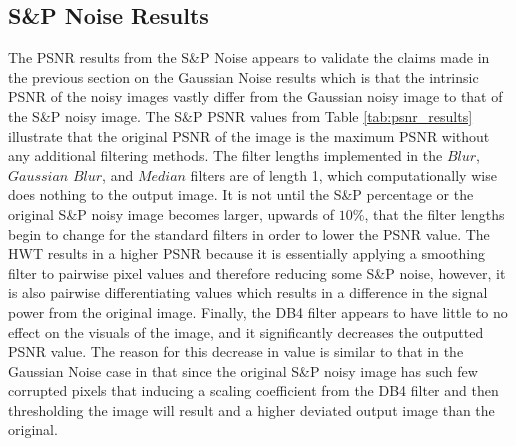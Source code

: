 \documentclass{article}\raggedbottom
\begin{document}
\subsection{S\&P Noise Results}
The PSNR results from the S\&P Noise appears to validate the claims made in the previous section on the Gaussian Noise results which is that the intrinsic PSNR of the noisy images vastly differ from the Gaussian noisy image to that of the S\&P noisy image. The S\&P PSNR values from Table \ref{tab:psnr_results} illustrate that the original PSNR of the image is the maximum PSNR without any additional filtering methods. The filter lengths implemented in the $Blur$, $Gaussian$ $Blur$, and $Median$ filters are of length 1, which computationally wise does nothing to the output image. It is not until the S\&P percentage or the original S\&P noisy image becomes larger, upwards of $10\%$, that the filter lengths begin to change for the standard filters in order to lower the PSNR value. The HWT results in a higher PSNR because it is essentially applying a smoothing filter to pairwise pixel values and therefore reducing some S\&P noise, however, it is also pairwise differentiating values which results in a difference in the signal power from the original image. Finally, the DB4 filter appears to have little to no effect on the visuals of the image, and it significantly decreases the outputted PSNR value. The reason for this decrease in value is similar to that in the Gaussian Noise case in that since the original S\&P noisy image has such few corrupted pixels that inducing a scaling coefficient from the DB4 filter and then thresholding the image will result and a higher deviated output image than the original. 
\end{document}
